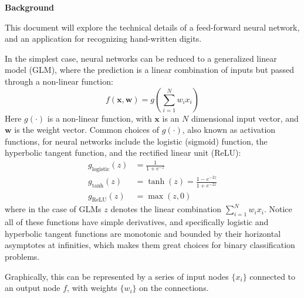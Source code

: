\documentclass[12pt]{article}
\newcommand{\mb}{\mathbf}
\begin{document}
\Large
{\bf Background}

\normalsize
This document will explore the technical details of a feed-forward 
neural network, and an application for recognizing hand-written digits.

In the simplest case, neural networks can be reduced to 
a generalized linear model (GLM),
where the prediction is a linear combination of inputs
but passed through a non-linear function:
%
\begin{equation}
	f(\mb{x},\mb{w}) = g\left( \sum_{i=1}^N w_i x_i \right)
\end{equation}
%
\indent Here $g(\cdot)$ is a non-linear function, 
with $\mb{x}$ is an $N$ dimensional input vector,
and $\mb{w}$ is the weight vector.
Common choices of $g(\cdot)$, also known as activation functions,
for neural networks 
include the logistic (sigmoid) function, the hyperbolic tangent function, 
and the rectified linear unit (ReLU):
%
\begin{equation}
\begin{aligned}
	g_{\text{logistic}}(z) &= \frac{1}{1+e^{-z}} \\
	g_{\text{tanh}}(z) &= \tanh(z) = \frac{1 - e^{-2z}}{1 + e^{-2z}}\\
	g_\text{ReLU}(z) &= \max(z,0)
\end{aligned}
\end{equation}
%
where in the case of GLMs $z$ denotes the linear combination
$\sum_{i=1}^N w_i x_i$.
Notice all of these functions have simple derivatives,
and specifically logistic and hyperbolic tangent functions 
are monotonic and bounded by their horizontal asymptotes at infinities,
which makes them great choices for binary classification problems.

Graphically, this can be represented by a series of 
input nodes $\{x_i\}$ connected to an output node $f$,
with weights $\{w_i\}$ on the connections.
\end{document}

